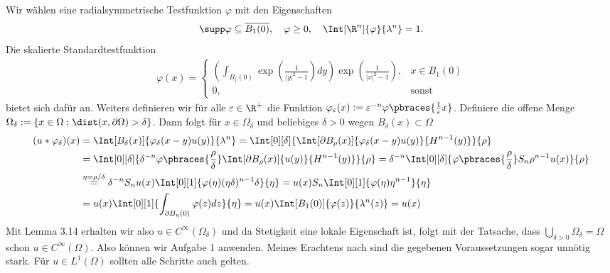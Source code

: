 \begin{solution}
	Wir wählen eine radialsymmetrische Testfunktion $\varphi$ mit den Eigenschaften
	\begin{align*}
	\supp \varphi \subseteq \overline{B_1(0)}, \quad \varphi \geq 0, \quad \Int[\R^n]{\varphi}{\lambda^n} = 1.
	\end{align*}
	Die skalierte Standardtestfunktion
  \begin{align*}
    \varphi(x) = \begin{cases}
      \left(\int_{B_1(0)}\exp\left(\frac{1}{|y|^2-1}\right) dy\right)
      \exp\left(\frac{1}{|x|^2-1}\right), & x \in B_1(0) \\
      0, & \text{sonst}
    \end{cases}
  \end{align*} bietet sich dafür an. Weiters definieren wir für alle $\varepsilon \in \R^+$ die Funktion $\varphi_\varepsilon (x) := \varepsilon^{-n} \varphi\pbraces{\frac{1}{\varepsilon}x}$.
  Definiere die offene Menge $\Omega_{\delta} := \{x \in \Omega: \dist(x,\partial\Omega) > \delta\}$.
  Dann folgt für $x \in \Omega_{\delta}$ und beliebiges $\delta > 0$ wegen $B_{\delta}(x) \subset \Omega$
	\begin{align*}
	(u \ast \varphi_\delta)(x) &= \Int[B_\delta(x)]{\varphi_\delta(x - y) u(y) }{\lambda^n}
  = \Int[0][\delta]{\Int[\partial B_\rho(x)]{\varphi_\delta(x - y) u(y) }{H^{n-1}(y)}}{\rho} \\
	 &= \Int[0][\delta]{\delta^{-n} \varphi\pbraces{\frac{\rho}{\delta}}
   \Int[\partial B_\rho(x)]{ u(y) }{H^{n-1}(y)}}{\rho} = \delta^{-n}
   \Int[0][\delta]{\varphi\pbraces{\frac{\rho}{\delta}}S_n \rho^{n-1} u(x)}{\rho} \\
	 &\stackrel{\eta = \rho/\delta}{=} \delta^{-n} S_n u(x) \Int[0][1]{\varphi(\eta) (\eta \delta)^{n-1} \delta }{\eta}
   = u(x) S_n  \Int[0][1]{\varphi(\eta) \eta^{n-1}  }{\eta} \\
	 &= u(x) \Int[0][1]{\int_{\partial B_{\eta}(0)}\varphi(z)  dz}{\eta}
   = u(x) \Int[B_1(0)]{\varphi(z)}{\lambda^n(z)} = u(x)
	\end{align*}
  Mit Lemma 3.14 erhalten wir also $u \in C^{\infty}(\Omega_{\delta})$
  und da Stetigkeit eine lokale Eigenschaft ist, folgt mit der Tatsache, dass
  $\bigcup_{\delta > 0}\Omega_\delta = \Omega$ schon $u \in C^{\infty}(\Omega)$.
  Also können wir Aufgabe 1 anwenden.
  Meines Erachtens nach sind die gegebenen Voraussetzungen sogar unnötig stark.
  Für $u \in L^1(\Omega)$ sollten alle Schritte auch gelten.
\end{solution}

